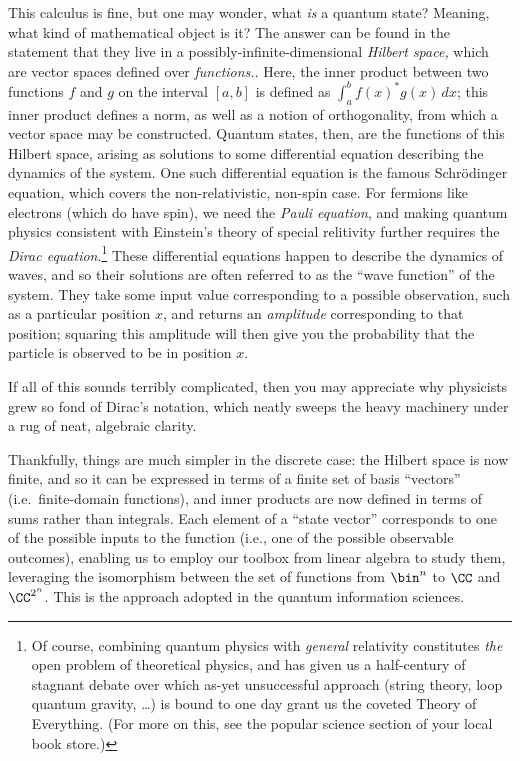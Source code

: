     This calculus is fine, but one may wonder, what \emph{is} a quantum
      state? Meaning, what kind of mathematical object is it? The answer
      can be found in the statement that they live in a possibly-infinite-dimensional 
      \emph{Hilbert space,} which are vector spaces defined over
      \emph{functions.}. Here, the inner product between two functions $f$ and
      $g$ on the interval $[a,b]$ is defined as $\int_{a}^{b}
      f(x)^* g(x)\, dx$; this inner product defines a norm, as well as a notion of
      orthogonality, from which a vector space may be constructed.
      Quantum states, then, are the functions of this Hilbert space, arising as
      solutions to some differential equation describing the dynamics of the system. 
      One such differential equation is the famous Schrödinger equation, 
      which covers the non-relativistic, non-spin case. 
      For fermions like electrons (which do have spin), we need the
      \emph{Pauli equation}, and making quantum physics consistent with
      Einstein's theory of special relitivity further requires the \emph{Dirac
      equation}.\footnote{
        Of course, combining quantum physics with \emph{general}
        relativity constitutes \emph{the} open problem of theoretical physics,
        and has given us a half-century of stagnant debate over which
        as-yet unsuccessful approach (string theory, loop quantum gravity,
        \ldots) is bound to one day grant us the coveted Theory of Everything. 
        (For more on this, see the popular science
        section of your local book store.)
      } These differential equations happen to describe the dynamics of waves,
      and so their solutions are often referred to as the ``wave function'' of
      the system. They take some input value corresponding to a possible
      observation, such as a particular position $x$, and returns an
      \emph{amplitude} corresponding to that position; squaring this amplitude
      will then give you the probability that the particle
      is observed to be in position $x$.

    If all of this sounds terribly complicated, then you may appreciate why
      physicists grew so fond of Dirac's notation, which neatly sweeps the
      heavy machinery under a rug of neat, algebraic clarity.

    Thankfully, things are much simpler in the discrete case: the Hilbert
      space is now finite, and so it can be expressed in terms of a finite set of basis
      ``vectors'' (i.e.\ finite-domain functions), and inner
      products are now defined in terms of sums rather than integrals. 
      Each element of a ``state vector'' corresponds to one of the possible inputs to
      the function (i.e., one of the possible observable outcomes), enabling us to
      employ our toolbox from linear algebra to study them, leveraging
      the isomorphism between the set of functions from $\bin^n$ to $\CC$ 
      and $\CC^{2^n}$. 
      This is the approach adopted in the quantum information sciences.

